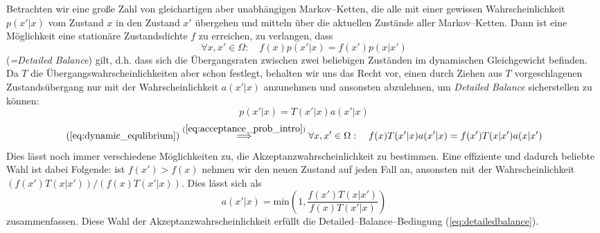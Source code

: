 	Betrachten wir eine große Zahl von gleichartigen aber unabhängigen Markov--Ketten, die alle mit einer gewissen Wahrscheinlichkeit $p(x'|x)$ vom Zustand $x$ in den Zustand $x'$ übergehen und mitteln über die aktuellen Zustände aller Markov--Ketten. Dann ist eine Möglichkeit eine stationäre Zustandsdichte $f$ zu erreichen, zu verlangen, dass
	\begin{equation}
		\forall x,x' \in \Omega :\quad f(x)p(x'|x) = f(x')p(x|x')
		\label{eq:dynamic_equlibrium}
	\end{equation}
	({\em =Detailed Balance}) gilt, d.h. dass sich die Übergangsraten zwischen zwei beliebigen Zuständen im dynamischen Gleichgewicht befinden.
	Da $T$ die Übergangswahrscheinlichkeiten aber schon festlegt, behalten wir uns das Recht vor, einen durch Ziehen aus $T$ vorgeschlagenen Zustandsübergang nur mit der Wahrscheinlichkeit $a(x'|x)$ anzunehmen und ansonsten abzulehnen,	um {\em Detailed Balance} sicherstellen zu können:
	\begin{equation}
		p(x'|x) = T(x'|x)a(x'|x)
		\label{eq:acceptance_prob_intro}
	\end{equation}
	\begin{equation}
		(\ref{eq:dynamic_equlibrium}) \stackrel{(\ref{eq:acceptance_prob_intro})}{\Longrightarrow}
		\forall x,x' \in \Omega :\quad f(x)T(x'|x)a(x'|x) = f(x')T(x|x')a(x|x')
		\label{eq:detailedbalance}
	\end{equation}
	Dies lässt noch immer verschiedene Möglichkeiten zu, die Akzeptanzwahrscheinlichkeit zu bestimmen. Eine effiziente und dadurch beliebte Wahl ist dabei Folgende: ist $f(x')>f(x)$ nehmen wir den neuen Zustand auf jeden Fall an, ansonsten mit der Wahrscheinlichkeit $(f(x')T(x|x'))/(f(x)T(x'|x))$. Dies lässt sich als
	\begin{equation}
		a(x'|x)=\text{min}\left(1,\frac{f(x')T(x|x')}{f(x)T(x'|x)}\right)
		\label{eq:acceptanceratio}
	\end{equation}
	zusammenfassen.
	Diese Wahl der Akzeptanzwahrscheinlichkeit erfüllt die Detailed--Balance--Bedingung (\ref{eq:detailedbalance}).
	
	
	
